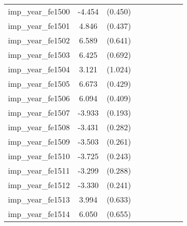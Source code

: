 {\begin{tabular}{l*{4}{cc}}
imp\_year\_fe1500&   -4.454\sym{***}&  (0.450)&                  &         &                  &         &                  &         \\
imp\_year\_fe1501&    4.846\sym{***}&  (0.437)&                  &         &                  &         &                  &         \\
imp\_year\_fe1502&    6.589\sym{***}&  (0.641)&                  &         &                  &         &                  &         \\
imp\_year\_fe1503&    6.425\sym{***}&  (0.692)&                  &         &                  &         &                  &         \\
imp\_year\_fe1504&    3.121\sym{**} &  (1.024)&                  &         &                  &         &                  &         \\
imp\_year\_fe1505&    6.673\sym{***}&  (0.429)&                  &         &                  &         &                  &         \\
imp\_year\_fe1506&    6.094\sym{***}&  (0.409)&                  &         &                  &         &                  &         \\
imp\_year\_fe1507&   -3.933\sym{***}&  (0.193)&                  &         &                  &         &                  &         \\
imp\_year\_fe1508&   -3.431\sym{***}&  (0.282)&                  &         &                  &         &                  &         \\
imp\_year\_fe1509&   -3.503\sym{***}&  (0.261)&                  &         &                  &         &                  &         \\
imp\_year\_fe1510&   -3.725\sym{***}&  (0.243)&                  &         &                  &         &                  &         \\
imp\_year\_fe1511&   -3.299\sym{***}&  (0.288)&                  &         &                  &         &                  &         \\
imp\_year\_fe1512&   -3.330\sym{***}&  (0.241)&                  &         &                  &         &                  &         \\
imp\_year\_fe1513&    3.994\sym{***}&  (0.633)&                  &         &                  &         &                  &         \\
imp\_year\_fe1514&    6.050\sym{***}&  (0.655)&                  &         &                  &         &                  &         \\

\end{tabular}}
